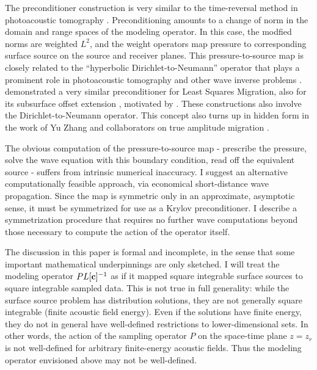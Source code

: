 The preconditioner construction is very similar to the time-reversal
method in photoacoustic tomography
\cite[]{StefanovUhlmannIP:09}. Preconditioning amounts to a change of
norm in the domain and range spaces of the modeling operator. In this
case, the modfied norms are weighted $L^2$, and the weight operators
map pressure to corresponding surface source on the source and
receiver planes. This pressure-to-source map is closely related to the ``hyperbolic
Dirichlet-to-Neumann'' operator that plays a prominent role in
photoacoustic tomography and other wave inverse problems
\cite[]{Rachele:00,StefUhl:05}. \cite{HouSymes:EAGE16} demonstrated a
very similar preconditioner for Least Squares Migration, also for its
subsurface offset extension \cite[]{HouSymes:16}, motivated by
\cite{tenKroode:12}. These constructions also involve the
Dirichlet-to-Neumann operator. This concept also turns up in hidden
form in the work of Yu Zhang and collaborators on true amplitude
migration
\cite[]{YuZhang:14,TangXuZhang:13,XuWang:2012,XuZhangTang:11,Zhang:SEG09}.

The obvious computation of the pressure-to-source map - prescribe the
pressure, solve the wave equation with this boundary condition, read
off the equivalent source - suffers from intrinsic numerical
inaccuracy. I suggest an alternative computationally feasible
approach, via economical short-distance wave propagation. Since the
map is symmetric only in an approximate, asymptotic sense, it must be
symmetrized for use as a Krylov preconditioner. I describe a
symmetrization procedure that requires no further wave computations
beyond those necessary to compute the action of the operator itself.

The discussion in this paper is formal and incomplete, in the sense
that some important mathematical underpinnings are only
sketched. I will treat the modeling operator $PL[{\bf c}]^{-1}$ as if
it mapped square integrable surface sources to square integrable sampled
data. This is not true in full generality: while the surface source
problem has distribution solutions, they are not generally square
integrable (finite acoustic field energy). Even if the solutions have
finite energy, they do not in general have well-defined
restrictions to lower-dimensional sets. In other words, the action of
the sampling
operator $P$ on the space-time plane $z=z_r$ is not well-defined for arbitrary
finite-energy acoustic fields. Thus the modeling operator envisioned above
may not be well-defined.

